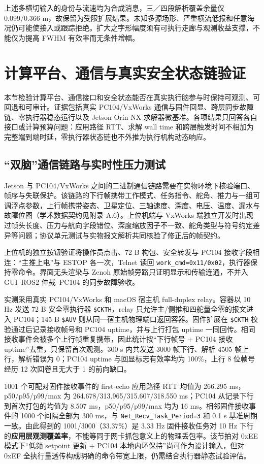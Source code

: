 上述多横切输入的身份与流速均为合成消息，三／四段解析覆盖余量仅 0.099/0.366 m，故保留为受限扩展结果。未知多源场形、严重横流低报和任意海况仍可能使接入或跟踪拒绝。扩大之字形幅度须有可执行走廊与观测收益支撑，不能仅为提高 FWHM 有效率而无条件增幅。
\FloatBarrier

\section{计算平台、通信与真实安全状态链验证}\label{sec:ch05-5-3}

本节检验计算平台、通信接口和安全状态能否在真实执行脑参与时保持可观测、可回退和可审计。证据包括真实 PC104/VxWorks 通信与固件回显、跨层同步故障链、零执行器稳态运行以及 Jetson Orin NX 求解器微基准。各项结果只回答各自接口或计算预算问题：应用路径 RTT、求解 wall time 和跨层触发时间不相加为完整端到端时延，零执行器状态链也不外推为执行机构动态响应。

\subsection{``双脑''通信链路与实时性压力测试}\label{sec:ch05-5-3-1}

Jetson 与 PC104/VxWorks 之间的二进制通信链路需要在实物环境下核验端口、帧序与失联保护。该链路的下行帧携带工作模式、任务指令、舵角、推力与一组可调浮点参数，上行帧携带姿态、卫星定位、三轴速度、深度、电压、温度、漏水与故障位图（学术数据契约见附录 A.6）。上位机端与 VxWorks 端独立开发时出现过帧头长度、压力与航向字段错位、深度缩放因子不一致、舵角类型与符号约定差异等问题；协议单元测试与实物报文解析共同核验了修正后的帧契约。

上位机的独立按钮验证将操作员点击、72 B 构包、安全转发与 PC104 接收字段相连：``主推上电''与 ESTOP 各一次，Telnet 读回 \texttt{work\_cmd=0x11/0x02}，执行器保持零命令。界面无头渲染与 Zenoh 原始帧旁路只证明显示和传输连通，不并入 GUI--ROS2 仲裁--PC104 的同步故障验收。

实测采用真实 PC104/VxWorks 和 macOS 宿主机 full-duplex relay。容器以 10 Hz 发送 72 B 安全零执行器 \texttt{\$CKTH}，relay 只允许主/侧推和四舵量全零的报文进入 PC104；145 B \texttt{\$AUV} 则从同一宿主机物理端口返回容器。固件扩展在 \texttt{\$CKTH} 校验通过后记录接收帧号和 PC104 uptime，并与上行打包 uptime 一同回传。相同接收事件会被多个上行帧重复携带，因此统计按``下行帧号 + PC104 接收 uptime''去重，只保留首次观测。300 s 内共发送 3000 帧下行、解析 4505 帧上行，解析错误为 0；PC104 uptime 与回显标志有效率均为 100\%，上行 8 位帧号经历 12 次回卷且无大于 1 的前向缺口。

1001 个可配对固件接收事件的 first-echo 应用路径 RTT 均值为 266.295 ms，p50/p95/p99/max 为 264.678/313.965/315.607/318.550 ms；PC104 从记录下行到首次打包的均值为 8.507 ms，p50/p95/p99/max 均为 16 ms。相邻固件接收事件的 1000 个间隔全部为 300 ms，与 \texttt{Net\_Recv\_Task\_Period=3} 和 0.1 s 基准周期一致。由此得到的 1001/3000（33.37\%）是 3.33 Hz 固件接收任务对 10 Hz 下行的\textbf{应用层观测覆盖率}，不能等同于网卡抓包意义上的物理丢包率。该节拍对 0xEE 模式下``低频 setpoint 更新 + PC104 本地内环保持''尚可作为设计输入，但对 0xEF 全执行量透传构成明确的命令带宽上限，仍需结合执行器静态试验评估。

